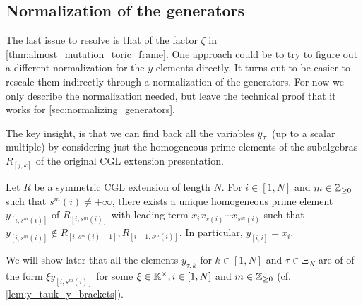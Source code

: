 \subsection{Normalization of the generators}

The last issue to resolve is that of the factor $\zeta$ in
\cref{thm:almost_mutation_toric_frame}. One approach could be to try to figure out a
different normalization for the $y$-elements directly. It turns out to be easier to
rescale them indirectly through a normalization of the generators. For now we only
describe the normalization needed, but leave the technical proof that it works for
\cref{sec:normalizing_generators}.

\medskip

The key insight, is that we can find back all the variables $\overline{y}_{\tau}$ (up to a
scalar multiple) by considering just the homogeneous prime elements of the subalgebras
$R_{[j, k]}$ of the original CGL extension presentation.

\begin{theorem}\label{thm:y_square_brackets}

	Let $R$ be a symmetric CGL extension of length $N$. For $i\in [1, N]$ and $m \in
		\mathbb{Z}_{\geq 0}$ such that $s^m(i) \neq + \infty$, there exists a unique homogeneous
	prime element $y_{[i, s^m(i)]}$ of $R_{[i, s^m(i)]}$
	with leading term $x_i x_{s(i)} \cdots x_{s^m(i)}$ such that $y_{[i, s^m(i)]} \notin
		R_{[i, s^m(i) - 1]}, R_{[i+1, s^m(i)]}$. In particular, $y_{[i, i]} = x_i$.
\end{theorem}

We will show later that all the elements $y_{\tau, k}$ for $k \in [1, N]$ and $\tau \in
	\Xi_N$ are of of the form $\xi y_{[i, s^m(i)]}$ for some $\xi \in \mathbb{K}^\times, i \in
	[1, N]$ and $m \in \mathbb{Z}_{\geq 0}$ (cf. \cref{lem:y_tauk_y_brackets}).

